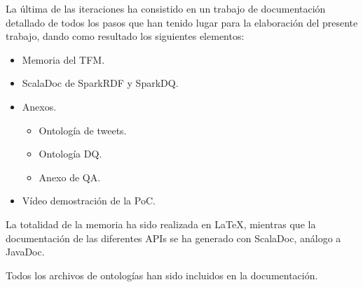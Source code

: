 

La última de las iteraciones ha consistido en un trabajo de documentación
detallado de todos los pasos que han tenido lugar para la elaboración del
presente trabajo, dando como resultado los siguientes elementos: 

\begin{itemize}
\item Memoria del \acs{TFM}.
\item ScalaDoc de SparkRDF y SparkDQ.
\item Anexos.
  \begin{itemize}
  \item Ontología de tweets.
  \item Ontología \acs{DQ}.
  \item Anexo de \acs{QA}.
  \end{itemize}
\item Vídeo demostración de la \acs{PoC}.
\end{itemize}

La totalidad de la memoria ha sido realizada en \LaTeX, mientras que la
documentación de las diferentes \acs{API}s se ha generado con ScalaDoc, análogo
a JavaDoc. 

Todos los archivos de ontologías han sido incluidos en la documentación. 
